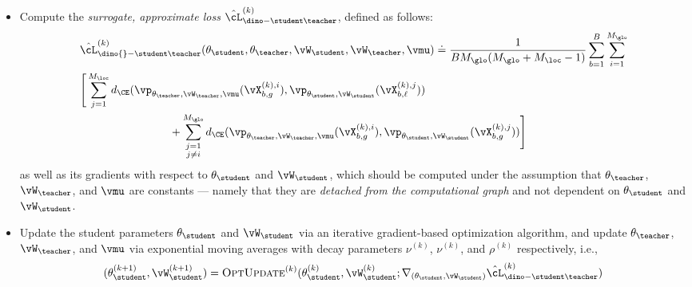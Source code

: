 \documentclass[../../book-main.tex]{subfiles}
\begin{document}
\begin{itemize}
\begin{align}
            &\vp_{\theta_{\teacher}, \vW_{\teacher}, \vmu}(\vX_{b,
            g}^{(k), i}) \doteq h_{\vW_{\teacher},
            \vmu}(\vZ_{\theta_{\teacher}}(\vX_{b, g}^{(k), i})).
        \end{align}
    \item Compute the \textit{surrogate, approximate loss}
        \(\hat{\cL}_{\dino-\student\teacher}^{(k)}\), defined as follows:
        \begin{align}\label{eq:dino_loss_teacherstudent_empirical}
            &\hat{\cL}_{\dino{}-\student\teacher}^{(k)}(\theta_{\student},
            \theta_{\teacher}, \vW_{\student}, \vW_{\teacher}, \vmu) \doteq
            \frac{1}{BM_{\glo}(M_{\glo} + M_{\loc} - 1)}\sum_{b =
            1}^{B}\sum_{i = 1}^{M_{\glo}}\\
            &\Bigg[\sum_{j =
                1}^{M_{\loc}}d_{\CE}(\vp_{\theta_{\teacher},
                    \vW_{\teacher}, \vmu}(\vX_{b, g}^{(k), i}),
                    \vp_{\theta_{\student}, \vW_{\student}}(\vX_{b,
                \ell}^{(k), j})) \\
                &\qquad \qquad \qquad \qquad + \sum_{\substack{j = 1 \\ j \neq
                i}}^{M_{\glo}}d_{\CE}(\vp_{\theta_{\teacher},
                    \vW_{\teacher}, \vmu}(\vX_{b, g}^{(k), i}),
                    \vp_{\theta_{\student}, \vW_{\student}}(\vX_{b, g}^{(k),
            j}))\Bigg]
        \end{align}
        as well as its gradients with respect to
        \(\theta_{\student}\) and \(\vW_{\student}\), which should be
        computed under the assumption that \(\theta_{\teacher}\),
        \(\vW_{\teacher}\), and \(\vmu\) are constants --- namely
        that they are \textit{detached from the computational graph}
        and not dependent on \(\theta_{\student}\) and \(\vW_{\student}\).
    \item Update the student parameters \(\theta_{\student}\) and
        \(\vW_{\student}\) via an iterative gradient-based
        optimization algorithm, and update \(\theta_{\teacher}\),
        \(\vW_{\teacher}\), and \(\vmu\) via exponential moving
        averages with decay parameters \(\nu^{(k)}\), \(\nu^{(k)}\),
        and \(\rho^{(k)}\) respectively, i.e.,
        \begin{align}
            &(\theta_{\student}^{(k + 1)}, \vW_{\student}^{(k + 1)})
            = \textsc{OptUpdate}^{(k)}(\theta_{\student}^{(k)},
                \vW_{\student}^{(k)}; \nabla_{(\theta_{\student},
            \vW_{\student})}\hat{\cL}_{\dino-\student\teacher}^{(k)}) \\

\end{align}
\end{itemize}
\end{document}
